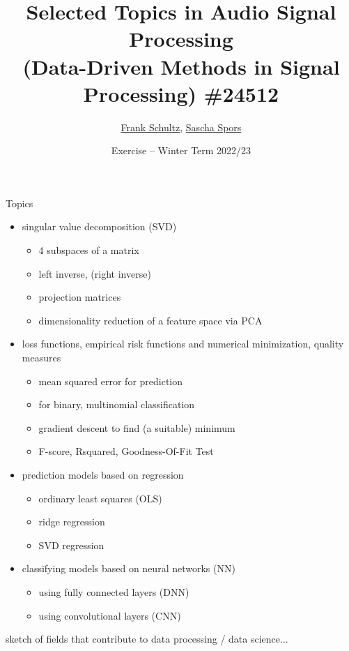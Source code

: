 \documentclass[mathserif, aspectratio=43]{intbeamer}
\title[STiASP \#24512 - Exercise]%
{Selected Topics in Audio Signal Processing\\(Data-Driven Methods in Signal Processing) \#24512}
\author[Schultz, Spors]{%
    \underline{\href{https://orcid.org/0000-0002-3010-0294}{Frank Schultz}}, \href{https://orcid.org/0000-0001-7225-9992}{Sascha Spors}}
\date[Winter Term 2022/23]{%
  Exercise -- Winter Term 2022/23}
\institute[]{Research Group Signal Processing and Virtual Acoustics,
University of Rostock}
\begin{document}
\maketitle
%
%
%

%
%
%

\begin{frame}{Topics}
\begin{itemize}
\item singular value decomposition (SVD)
  \begin{itemize}
  \item 4 subspaces of a matrix
  \item left inverse, (right inverse)
  \item projection matrices
  \item dimensionality reduction of a feature space via PCA
  \end{itemize}
\item loss functions, empirical risk functions and numerical minimization, quality measures
\begin{itemize}
\item mean squared error for prediction
\item for binary, multinomial classification
\item gradient descent to find (a suitable) minimum
\item F-score, Rsquared, Goodness-Of-Fit Test
\end{itemize}
\item prediction models based on regression
    \begin{itemize}
    \item ordinary least squares (OLS)
    \item ridge regression
    \item SVD regression
    \end{itemize}
\item classifying models based on neural networks (NN)
  \begin{itemize}
  \item using fully connected layers (DNN)
  \item using convolutional layers (CNN)
  \end{itemize}
\end{itemize}
sketch of fields that contribute to data processing / data science...
\end{frame}
%
%
%
\end{document}
